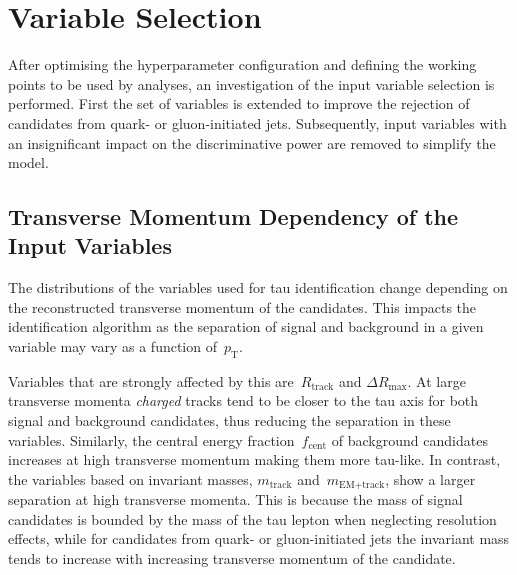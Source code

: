 \section{Variable Selection}
\label{sec:bdt_variable_selection}

After optimising the hyperparameter configuration and defining the working
points to be used by analyses, an investigation of the input variable selection
is performed. First the set of variables is extended to improve the rejection of
\tauhadvis candidates from quark- or gluon-initiated jets. Subsequently, input
variables with an insignificant impact on the discriminative power are removed
to simplify the model.

\subsection{Transverse Momentum Dependency of the Input Variables}
\label{sec:bdt_incl_pt}


The distributions of the variables used for tau identification change depending
on the reconstructed transverse momentum of the \tauhadvis candidates. This
impacts the identification algorithm as the separation of signal and background
in a given variable may vary as a function of~$p_\text{T}$.

Variables that are strongly affected by this are~$R_\text{track}$ and
$\Delta R_\text{max}$. At large transverse momenta \emph{charged} tracks tend to
be closer to the tau axis for both signal and background candidates, thus
reducing the separation in these variables. Similarly, the central energy
fraction~$f_\text{cent}$ of background candidates increases at high transverse
momentum making them more tau-like. In contrast, the variables based on
invariant masses, $m_\text{track}$ and~$m_\text{EM+track}$, show a larger
separation at high transverse momenta. This is because the mass of signal
candidates is bounded by the mass of the tau lepton when neglecting resolution
effects, while for candidates from quark- or gluon-initiated jets the invariant
mass tends to increase with increasing transverse momentum of the \tauhadvis
candidate.

